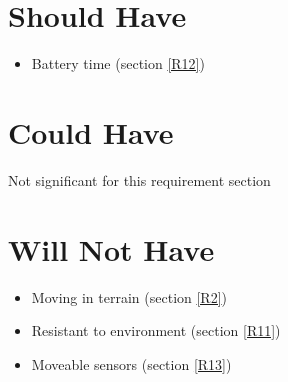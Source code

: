 \section*{Should Have}
\begin{itemize}

    \vspace{-3.5mm}

\item Battery time  (section \ref{R12})

\end{itemize}

\vspace{-2mm}

\section*{Could Have}

    \vspace{-3.5mm}
    
Not significant for this requirement section

\vspace{-2mm}

\section*{Will Not Have}
\begin{itemize}

    \vspace{-3.5mm}

\item Moving in terrain (section \ref{R2})

    \vspace{-3.5mm}

\item Resistant to environment  (section \ref{R11})

    \vspace{-3.5mm}

\item Moveable sensors (section \ref{R13})
\end{itemize}





     
    
    
     
    
     
    
     
    
     
    
     
    
     
    
     
    
     
    
     
    
     
    
    
     






